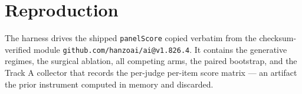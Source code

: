 \documentclass[11pt]{article}
\theoremstyle{definition}
\begin{document}
\section*{Reproduction}

The harness drives the shipped \texttt{panelScore} copied verbatim from the checksum-verified
module \texttt{github.com/hanzoai/ai@v1.826.4}. It contains the generative regimes, the
surgical ablation, all competing arms, the paired bootstrap, and the Track A collector that
records the per-judge per-item score matrix --- an artifact the prior instrument computed in
memory and discarded.
\end{document}

